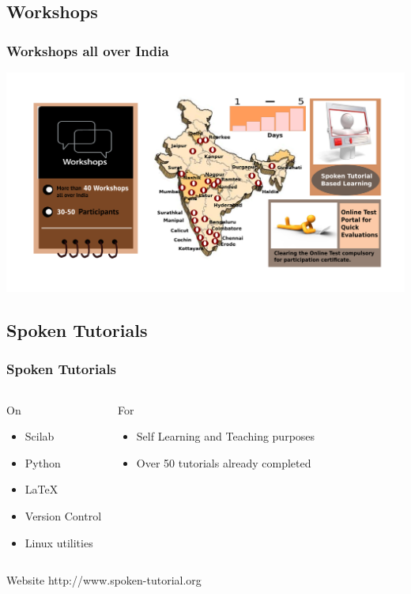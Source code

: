 \documentclass[compress,red]{beamer} %
\begin{document}
\subsection{Workshops}
\begin{frame}
\frametitle{Workshops all over India}
\begin{center}
\includegraphics[scale=.15]{workshop.png}
\end{center}
\end{frame}

\subsection{Spoken Tutorials}
\begin{frame}
\frametitle{Spoken Tutorials}
\begin{columns}
\begin{block}{On}
\begin{itemize}
\item Scilab \pause
\item Python \pause
\item \LaTeX \pause
\item Version Control \pause
\item Linux utilities \pause
\end{itemize}
\end{block}
\begin{block}{For}
\begin{itemize}
\item Self Learning and Teaching purposes \pause
\item Over \alert{50} tutorials already completed \pause
\end{itemize}
\end{block}
\pause
\end{columns}
\begin{block}{Website}
http://www.spoken-tutorial.org
\end{block}
\end{frame}
\end{document}
